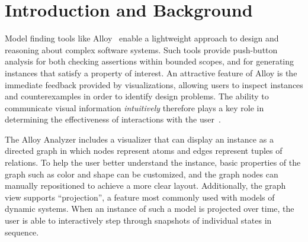 \documentclass[runningheads]{llncs}
\begin{document}


\section{Introduction and Background}
\label{introduction}

Model finding tools like Alloy~\cite{jackson2012} enable a lightweight approach to design and reasoning about complex software systems. Such tools provide push-button analysis for both checking assertions within bounded scopes, and for generating instances that satisfy a property of interest. An attractive feature of Alloy is the immediate feedback provided by visualizations, allowing users to inspect instances and counterexamples in order to identify design problems. The ability to communicate visual information \emph{intuitively} therefore plays a key role in determining the effectiveness of interactions with the user~\cite{gammaitoni2014}.

The Alloy Analyzer includes a visualizer that can display an instance as a directed graph in which nodes represent atoms and edges represent tuples of relations.
To help the user better understand the instance, basic properties of the graph such as color and shape can be customized, and the graph nodes can manually repositioned to achieve a more clear layout.
Additionally, the graph view supports ``projection'', a feature most commonly used with models of dynamic systems. 
When an instance of such a model is projected over time, the user is able to interactively step through snapshots of individual states in sequence.
\end{document}
